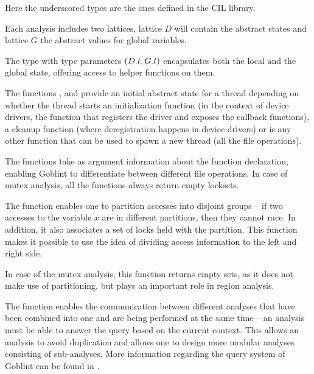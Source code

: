 \documentclass[..thesis.tex]{subfiles}
\begin{document}
Here the underscored types are the ones defined in the CIL library.

Each analysis includes two lattices, lattice $D$ will contain the abstract states and lattice $G$ the abstract values for global variables.

The type  with type parameters $\left( D.t, G.t \right)$ encapsulates both the local and the global state, offering access to helper functions on them. 

The functions ,  and  provide an initial abstract state for a thread depending on whether the thread starts an
initialization function (in the context of device drivers, the function that registers the driver and exposes the callback functions),
a cleanup function (where deregistration happens in device drivers) or is any other function that can be used to spawn a new thread (all the file operations).

The functions take as argument information about the function declaration, enabling Goblint to differentiate between different file operations.
In case of mutex analysis, all the functions always return empty locksets.

The  function enables one to partition accesses into disjoint groups -- if two accesses to the variable $x$ are in different partitions,
then they cannot race. In addition, it also associates a set of locks held with the partition.
This function makes it possible to use the idea of dividing access information to the left and right side.

In case of the mutex analysis, this function returns empty sets, as it does not make use of partitioning, but plays an important role in region analysis.


The  function enables the communication between different analyses that have been combined into one and are being performed at the same time -- 
an analysis must be able to answer the query based on the current context. This allows an analysis to avoid duplication and allows one to design more modular analyses consisting of sub-analyses.
More information regarding the query system of Goblint can be found in \cite[113]{apinis_frameworks_2014}.
\end{document}
